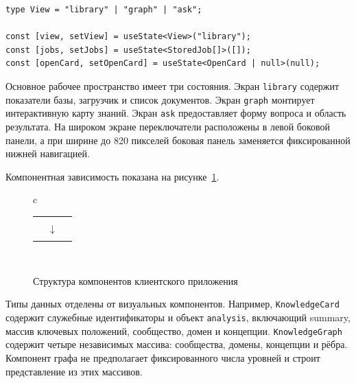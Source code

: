 \begin{verbatim}
type View = "library" | "graph" | "ask";

const [view, setView] = useState<View>("library");
const [jobs, setJobs] = useState<StoredJob[]>([]);
const [openCard, setOpenCard] = useState<OpenCard | null>(null);
\end{verbatim}

Основное рабочее пространство имеет три состояния. Экран \texttt{library} содержит показатели базы, загрузчик и список документов. Экран \texttt{graph} монтирует интерактивную карту знаний. Экран \texttt{ask} предоставляет форму вопроса и область результата. На широком экране переключатели расположены в левой боковой панели, а при ширине до 820 пикселей боковая панель заменяется фиксированной нижней навигацией.

Компонентная зависимость показана на рисунке~\ref{fig:frontend_components_implementation}.

\begin{figure}[h!]
\centering
\begin{tabular}{c}
\\[0.5em]
\begin{tabular}{c@{\hspace{0.5em}}c@{\hspace{0.5em}}c}
\fbox{\parbox{0.25\textwidth}{\centering \texttt{AuthScreen}}} &
\fbox{\parbox{0.25\textwidth}{\centering \texttt{Library}}} &
\fbox{\parbox{0.25\textwidth}{\centering \texttt{GraphExplorer}}} \\
& $\downarrow$ & \\
\fbox{\parbox{0.25\textwidth}{\centering \texttt{AskPanel}}} &
\fbox{\parbox{0.25\textwidth}{\centering \texttt{UploadZone}\\\texttt{JobsTable}}} &
\fbox{\parbox{0.25\textwidth}{\centering \texttt{CardModal}}}
\end{tabular}\\[0.5em]
\end{tabular}
\caption{Структура компонентов клиентского приложения}
\label{fig:frontend_components_implementation}
\end{figure}

Типы данных отделены от визуальных компонентов. Например, \texttt{KnowledgeCard} содержит служебные идентификаторы и объект \texttt{analysis}, включающий summary, массив ключевых положений, сообщество, домен и концепции. \texttt{KnowledgeGraph} содержит четыре независимых массива: сообщества, домены, концепции и рёбра. Компонент графа не предполагает фиксированного числа уровней и строит представление из этих массивов.

